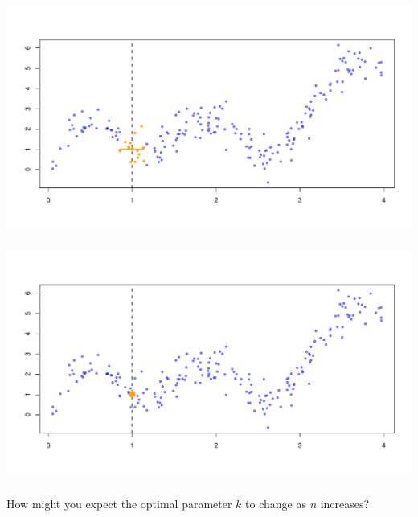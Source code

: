 \documentclass[xetex,mathserif,serif,aspectratio=169]{beamer}
\begin{document}
\begin{frame}[fragile] \frametitle{} \oldB \small

\begin{center}
\includegraphics[width=\textwidth]{img/knn3.pdf}
\end{center}

\end{frame}

\begin{frame}[fragile] \frametitle{} \oldB \small

\begin{center}
\includegraphics[width=\textwidth]{img/knn4.pdf}
\end{center}

\end{frame}

\begin{frame}[fragile] \frametitle{} \oldB \small


How might you expect the optimal parameter $k$ to change as $n$ increases?

\end{frame}
\end{document}
